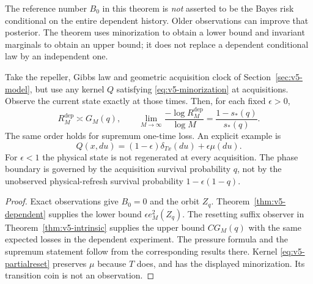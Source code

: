 The reference number $B_0$ in this theorem is \emph{not} asserted
to be the Bayes risk conditional on the entire dependent history.
Older observations can improve that posterior. The theorem uses
minorization to obtain a lower bound and invariant marginals to
obtain an upper bound; it does not replace a dependent conditional
law by an independent one.

\begin{corollary}
\label{cor:v5-dependentpressure}
Take the repeller, Gibbs law and geometric acquisition clock of
Section~\ref{sec:v5-model}, but use any kernel $Q$ satisfying
\eqref{eq:v5-minorization} at acquisitions. Observe the current
state exactly at those times. Then, for each fixed $\epsilon>0$,
\[
 R_M^{\mathrm{dep}}\asymp G_M(q),\qquad
 \lim_{M\to\infty}\frac{-\log R_M^{\mathrm{dep}}}{\log M}
 =\frac{1-s_*(q)}{s_*(q)}.
\]
The same order holds for supremum one-time loss. An explicit
example is
\begin{equation}\label{eq:v5-partialreset}
 Q(x,du)=(1-\epsilon)\delta_{Tx}(du)+\epsilon\mu(du).
\end{equation}
For $\epsilon<1$ the physical state is not regenerated at every
acquisition. The phase boundary is governed by the acquisition
survival probability $q$, not by the unobserved physical-refresh
survival probability $1-\epsilon(1-q)$.
\end{corollary}

\begin{proof}
Exact observations give $B_0=0$ and the orbit $Z_q$.
Theorem~\ref{thm:v5-dependent} supplies the lower bound
$\epsilon e_M^2(Z_q)$. The resetting suffix observer in
Theorem~\ref{thm:v5-intrinsic} supplies the upper bound $CG_M(q)$
with the same expected losses in the dependent experiment.
The pressure formula and the supremum statement follow from the
corresponding results there. Kernel \eqref{eq:v5-partialreset}
preserves $\mu$ because $T$ does, and has the displayed
minorization. Its transition coin is not an observation.
\end{proof}

